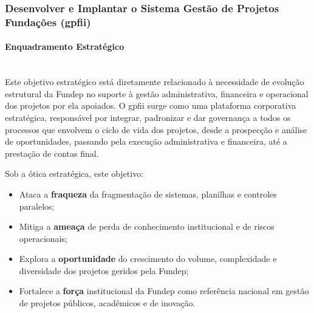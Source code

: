 \documentclass[12pt,a4paper]{article}
\begin{document}
\subsubsection{Desenvolver e Implantar o Sistema Gestão de Projetos Fundações (\gls{gpfii})}

\paragraph{Enquadramento Estratégico}\mbox{}\\
Este objetivo estratégico está diretamente relacionado à necessidade de evolução estrutural da Fundep no suporte à gestão administrativa, financeira e operacional dos projetos por ela apoiados. 
O \gls{gpfii} surge como uma plataforma corporativa estratégica, responsável por integrar, padronizar e dar governança a todos os processos que envolvem o ciclo de vida dos projetos, desde a prospecção e análise de oportunidades, passando pela execução administrativa e financeira, até a prestação de contas final.

Sob a ótica estratégica, este objetivo:
\begin{itemize}
  \item Ataca a \textbf{fraqueza} da fragmentação de sistemas, planilhas e controles paralelos;
  \item Mitiga a \textbf{ameaça} de perda de conhecimento institucional e de riscos operacionais;
  \item Explora a \textbf{oportunidade} do crescimento do volume, complexidade e diversidade dos projetos geridos pela Fundep;
  \item Fortalece a \textbf{força} institucional da Fundep como referência nacional em gestão de projetos públicos, acadêmicos e de inovação.
\end{itemize}
\end{document}
